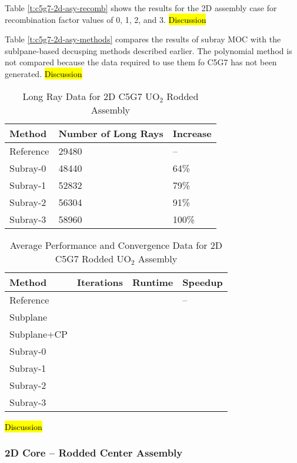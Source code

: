 Table \ref{t:c5g7-2d-asy-recomb} shows the results for the 2D assembly case for recombination factor values of 0, 1, 2, and 3. \hl{Discussion}

Table \ref{t:c5g7-2d-asy-methods} compares the results of subray MOC with the sublpane-based decusping methods described earlier.  The polynomial method is not compared because the data required to use them fo C5G7 has not been generated. \hl{Discussion}

\begin{table}[h]
    \centering
    \caption{Long Ray Data for 2D C5G7 UO\texorpdfstring{$_2$}{2} Rodded Assembly}\label{t:subray-data-2dassembly}
    \begin{tabular}{l l l}\toprule
        Method & Number of Long Rays & Increase \\\midrule
        Reference & 29480 & -- \\
        Subray-0 & 48440 & 64\% \\
        Subray-1 & 52832 & 79\% \\
        Subray-2 & 56304 & 91\% \\
        Subray-3 & 58960 & 100\% \\
        \bottomrule
    \end{tabular}
\end{table}

\begin{table}[h]
    \centering
    \caption{Average Performance and Convergence Data for 2D C5G7 Rodded UO\texorpdfstring{$_2$}{2} Assembly}\label{t:subray-performance-2dassembly}
    \begin{tabular}{l l l l}\toprule
        Method & Iterations & Runtime & Speedup \\\midrule
        Reference &  &  & -- \\
        Subplane &  &  &  \\
        Subplane+CP &  &  &  \\
        Subray-0 &  &  &  \\
        Subray-1 &  &  &  \\
        Subray-2 &  &  &  \\
        Subray-3 &  &  &  \\
        \bottomrule
    \end{tabular}
\end{table}

\hl{Discussion}

\subsubsection{2D Core -- Rodded Center Assembly}

